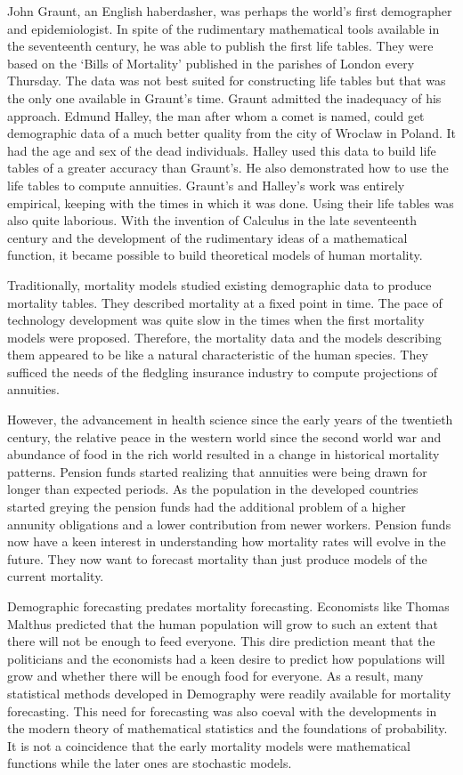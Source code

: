 \documentclass{article}
\numberwithin{equation}{section}
\begin{document}
John Graunt, an English haberdasher, was perhaps the world's first demographer
and epidemiologist. In spite of the rudimentary mathematical tools available
in the seventeenth century, he was able to publish the first life tables. They
were based on the `Bills of Mortality' published in the parishes of London
every Thursday. The data was not best suited for constructing life tables but
that was the only one available in Graunt's time. Graunt admitted the 
inadequacy of his approach. Edmund Halley, the man after whom a comet is 
named, could get demographic data of a much better quality from the city of
Wroclaw in Poland. It had the age and sex of the dead individuals. Halley
used this data to build life tables of a greater accuracy than Graunt's. He
also demonstrated how to use the life tables to compute annuities. Graunt's
and Halley's work was entirely empirical, keeping with the times in which
it was done. Using their life tables was also quite laborious. With the 
invention of Calculus in the late seventeenth century and the development of 
the rudimentary ideas of a mathematical function, it became possible to build
theoretical models of human mortality.

Traditionally, mortality models studied existing demographic data to produce
mortality tables. They described mortality at a fixed point in time. The pace 
of technology development was quite slow in the times when the first mortality
models were proposed. Therefore, the mortality data and the models describing
them appeared to be like a natural characteristic of the human species. They
sufficed the needs of the fledgling insurance industry to compute projections
of annuities.

However, the advancement in health science since the early years of the 
twentieth century, the relative peace in the western world since the second 
world war and abundance of food in the rich world resulted in a change in
historical mortality patterns. Pension funds started realizing that annuities
were being drawn for longer than expected periods. As the population in the
developed countries started greying the pension funds had the additional 
problem of a higher annunity obligations and a lower contribution from newer
workers. Pension funds now have a keen interest in understanding how mortality 
rates will evolve in the future. They now want to forecast mortality than just
produce models of the current mortality. 

Demographic forecasting predates mortality forecasting. Economists like Thomas
Malthus predicted that the human population will grow to such an extent that
there will not be enough to feed everyone. This dire prediction meant that the
politicians and the economists had a keen desire to predict how populations
will grow and whether there will be enough food for everyone. As a result, many 
statistical methods developed in Demography were readily available for mortality
forecasting. This need for forecasting was also coeval with the developments
in the modern theory of mathematical statistics and the foundations of
probability. It is not a coincidence that the early mortality models were
mathematical functions while the later ones are stochastic models.
\end{document}
